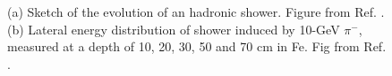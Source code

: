 \begin{figure}[ht]
\centering
{}
\caption{(a) Sketch of the evolution of an hadronic shower. Figure from Ref. \cite{grupen_shwartz_2008}. (b) Lateral energy distribution of shower induced by 10-GeV $\pi^-$, measured at a depth of 10, 20, 30, 50 and 70 cm in Fe. Fig from Ref. \cite{FRIEND1976505}.}
\label{fig:det:shower_had}
\end{figure}


